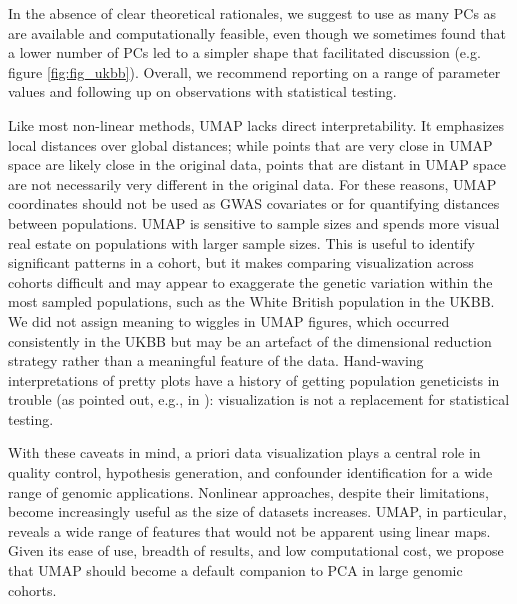 \documentclass[12pt]{pnas-new}
\begin{document}
In the absence of clear theoretical rationales, we suggest to use as many PCs as are available and computationally feasible, even though we sometimes found that a lower number of PCs led to a simpler shape that facilitated discussion (e.g. figure \ref{fig:fig_ukbb}). Overall, we recommend reporting on a range of parameter values and following up on observations with statistical testing. 

Like most non-linear methods, UMAP lacks direct interpretability. It emphasizes local distances over global distances; while points that are very close in UMAP space are likely close in the original data, points that are distant in UMAP space are not necessarily very different in the original data. For these reasons, UMAP coordinates should not be used as GWAS covariates or for quantifying distances between populations. UMAP is sensitive to sample sizes and spends more visual real estate on populations with larger sample sizes. This is useful to identify significant patterns in a cohort, but it makes comparing visualization across cohorts difficult and may appear to exaggerate the genetic variation within the most sampled populations, such as the White British population in the UKBB. We did not assign meaning to wiggles in UMAP figures, which occurred consistently in the UKBB but may be an artefact of the dimensional reduction strategy rather than a meaningful feature of the data. Hand-waving interpretations of pretty plots have a history of getting population geneticists in trouble (as pointed out, e.g., in \cite{novembre2008interpreting}): visualization is not a replacement for statistical testing.

With these caveats in mind, a priori data visualization plays a central role in quality control, hypothesis generation, and confounder identification for a wide range of genomic applications. Nonlinear approaches, despite their limitations, become increasingly useful as the size of datasets increases. UMAP, in particular, reveals a wide range of features that would not be apparent using linear maps. Given its ease of use, breadth of results, and low computational cost, we propose that UMAP should become a default companion to PCA in large genomic cohorts.
\end{document}
